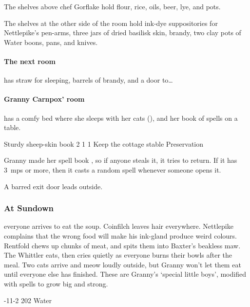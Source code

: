 \documentclass[10pt,twoside]{book}
\begin{document}
The shelves above chef Gorflake hold
 flour,
 rice,
 oils,
 beer,
 lye,
and
 pots.

The shelves at the other side of the room hold
 ink-dye suppositories for Nettlepike's pen-arms,
 three jars of dried \gls{basilisk} skin,
 brandy,
 two clay pots of Water \glspl{boon},
 pans,
and
 knives.

\paragraph{The next room}
has straw for sleeping, barrels of brandy, and a door to\ldots

\paragraph{Granny Carnpox' room}
has a comfy bed where she sleeps with her cats (), and her book of \glspl{spell} on a table.

  {Sturdy sheep-skin book}%
  {2}%
  {1}%
  {1}%
  {Keep the cottage stable}%
  {Preservation}%
  {
    \setcounter{Fate}{3}
    \setcounter{Water}{3}
    \setcounter{Cultivation}{1}
    \setcounter{Academics}{1}
  }%

\noindent
Granny made her spell book , so if anyone steals it, it tries to return.
If it has 3~\glspl{mp} or more, then it casts a random \gls{spell} whenever someone opens it.

A barred exit door leads outside.

\subsubsection{At Sundown}
everyone arrives to eat the soup.
Coinfilch leaves hair everywhere.
Nettlepike complains that the wrong food will make his ink-gland produce weird colours.
Rentfold chews up chunks of meat, and spits them into Baxter's beakless maw.
The Whittler eats, then cries quietly as everyone burns their bowls after the meal.
Two cats arrive and meow loudly outside, but Granny won't let them eat until everyone else has finished.
These are Granny's `special little boys', modified with \glspl{spell} to grow big and strong.

%
  {{-1}{1}{-2}}%
  {{2}{0}{2}}%
  {%
    \Dagger
  }%
  {}%
  {Water }%
  {}%
\end{document}
